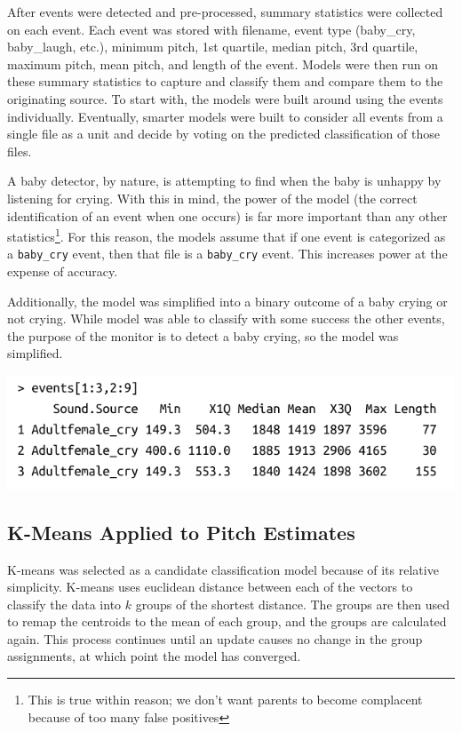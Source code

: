 \documentclass[paper=a4, fontsize=11pt]{scrartcl}
\numberwithin{equation}{section}
\numberwithin{figure}{section}
\numberwithin{table}{section}
\begin{document}
\noindent After events were detected and pre-processed, summary statistics were collected on each event. Each event was stored with filename, event type (baby\_cry, baby\_laugh, etc.), minimum pitch, 1st quartile, median pitch, 3rd quartile, maximum pitch, mean pitch, and length of the event. Models were then run on these summary statistics to capture and classify them and compare them to the originating source. To start with, the models were built around using the events individually. Eventually, smarter models were built to consider all events from a single file as a unit and decide by voting on the predicted classification of those files.

\noindent A baby detector, by nature, is attempting to find when the baby is unhappy by listening for crying. With this in mind, the power of the model (the correct identification of an event when one occurs) is far more important than any other statistics\footnote{This is true within reason; we don't want parents to become complacent because of too many false positives}. For this reason, the models assume that if one event is categorized as a \texttt{baby\_cry} event, then that file is a \texttt{baby\_cry} event. This increases power at the expense of accuracy.

\noindent Additionally, the model was simplified into a binary outcome of a baby crying or not crying. While model was able to classify with some success the other events, the purpose of the monitor is to detect a baby crying, so the model was simplified.

\begin{center}
\includegraphics[width=.65\textwidth]{aubio_events.pdf}
\end{center}

\subsection{K-Means Applied to Pitch Estimates}
K-means was selected as a candidate classification model because of its relative simplicity. K-means uses euclidean distance between each of the vectors to classify the data into $k$ groups of the shortest distance. The groups are then used to remap the centroids to the mean of each group, and the groups are calculated again. This process continues until an update causes no change in the group assignments, at which point the model has converged.
\end{document}

